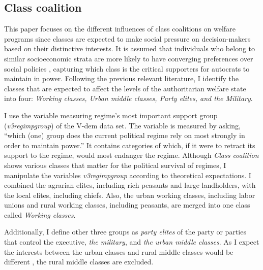 \documentclass[11pt]{article}
\begin{document}

\subsection{Class coalition}

This paper focuses on the different influences of class coalitions on welfare programs since classes are expected to make social pressure on decision-makers based on their distinctive interests. It is assumed that individuals who belong to similar socioeconomic strata are more likely to have converging preferences over social policies \citet[1495]{Dahlum2019}, capturing which class is the critical supporters for autocrats to maintain in power. Following the previous relevant literature, I identify the classes that are expected to affect the levels of the authoritarian welfare state into four: \textit{Working classes, Urban middle classes, Party elites, and the Military}.

I use the variable measuring regime's most important support group (\textit{v3regimpgroup}) of the V-dem data set. The variable is measured by asking, ``which (one) group does the current political regime rely on most strongly in order to maintain power.'' It contains categories of which, if it were to retract its support to the regime, would most endanger the regime. Although \textit{Class coalition} shows various classes that matter for the political survival of regimes, I manipulate the variables \textit{v3regimpgroup} according to theoretical expectations. I combined the agrarian elites, including rich peasants and large landholders, with the local elites, including chiefs. Also, the urban working classes, including labor unions and rural working classes, including peasants, are merged into one class called \textit{Working classes}.

Additionally, I define other three groups as \textit{party elites} of the party or parties that control the executive, \textit{the military}, and \textit{the urban middle classes}. As I expect the interests between the urban classes and rural middle classes would be different \citep{Dahlum2019}, the rural middle classes are excluded.
\end{document}
